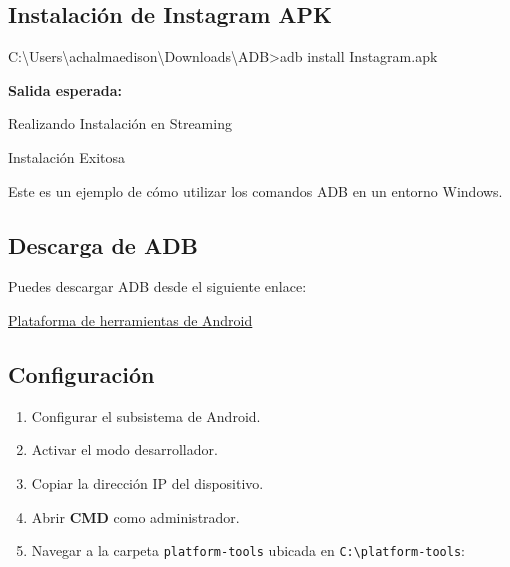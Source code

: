 \documentclass[
  doc,
  floatsintext,
  longtable,
  a4paper,
  nolmodern,
  notxfonts,
  notimes,
  12pt,
  colorlinks=true,linkcolor=blue,citecolor=blue,urlcolor=blue]{apa7}
\newenvironment{Shaded}{\begin{snugshade}}{\end{snugshade}}
\newcommand{\ExtensionTok}[1]{\textcolor[rgb]{0.00,0.23,0.31}{#1}}
\newcommand{\NormalTok}[1]{\textcolor[rgb]{0.00,0.23,0.31}{#1}}
\newcommand{\OperatorTok}[1]{\textcolor[rgb]{0.37,0.37,0.37}{#1}}
\begin{document}
\subsection{Instalación de Instagram
APK}\label{instalaciuxf3n-de-instagram-apk}

\begin{Shaded}
\begin{Highlighting}[]

\ExtensionTok{C:\textbackslash{}Users\textbackslash{}achalmaedison\textbackslash{}Downloads\textbackslash{}ADB}\OperatorTok{\textgreater{}}\NormalTok{adb install Instagram.apk}
\end{Highlighting}
\end{Shaded}

\textbf{Salida esperada:}

\begin{Shaded}
\begin{Highlighting}[]

\ExtensionTok{Realizando}\NormalTok{ Instalación en Streaming}

\ExtensionTok{Instalación}\NormalTok{ Exitosa}
\end{Highlighting}
\end{Shaded}

Este es un ejemplo de cómo utilizar los comandos ADB en un entorno
Windows.

\subsection{Descarga de ADB}\label{descarga-de-adb}

Puedes descargar ADB desde el siguiente enlace:

\href{https://developer.android.com/studio/releases/platform-tools}{Plataforma
de herramientas de Android}

\subsection{Configuración}\label{configuraciuxf3n}

\begin{enumerate}
\def\labelenumi{\arabic{enumi}.}
\item
  Configurar el subsistema de Android.
\item
  Activar el modo desarrollador.
\item
  Copiar la dirección IP del dispositivo.
\item
  Abrir \textbf{CMD} como administrador.
\item
  Navegar a la carpeta \texttt{platform-tools} ubicada en
  \texttt{C:\textbackslash{}platform-tools}:
\end{enumerate}
\end{document}
